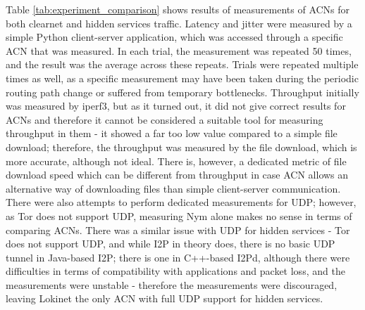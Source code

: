 Table \ref{tab:experiment_comparison} shows results of measurements of ACNs for both clearnet and hidden services traffic.
Latency and jitter were measured by a simple Python client-server application, which was accessed through a specific ACN that was measured. In each trial, the measurement was repeated 50 times, and the result was the average across these repeats. Trials were repeated multiple times as well, as a specific measurement may have been taken during the periodic routing path change or suffered from temporary bottlenecks.
Throughput initially was measured by iperf3, but as it turned out, it did not give correct results for ACNs and therefore it cannot be considered a suitable tool for measuring throughput in them - it showed a far too low value compared to a simple file download; therefore, the throughput was measured by the file download, which is more accurate, although not ideal. There is, however, a dedicated metric of file download speed which can be different from throughput in case ACN allows an alternative way of downloading files than simple client-server communication. There were also attempts to perform dedicated measurements for UDP; however, as Tor does not support UDP, measuring Nym alone makes no sense in terms of comparing ACNs. There was a similar issue with UDP for hidden services - Tor does not support UDP, and while I2P in theory does, there is no basic UDP tunnel in Java-based I2P; there is one in C++-based I2Pd, although there were difficulties in terms of compatibility with applications and packet loss, and the measurements were unstable - therefore the measurements were discouraged, leaving Lokinet the only ACN with full UDP support for hidden services.
